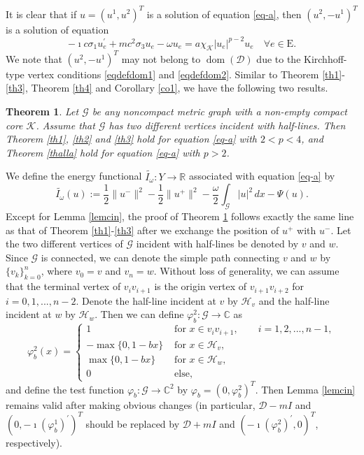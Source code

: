 \documentclass[11pt]{amsart}
\newtheorem{theorem}{Theorem}[section]
\newcommand{\abs}[1]{\lvert#1\rvert}
\newcommand{\norm}[1]{\lVert#1\rVert}
\newcommand{\D}{\mathcal{D}}
\newcommand{\G}{\mathcal{G}}
\newcommand{\K}{\mathcal{K}}
\newcommand{\h}{\mathcal{H}}
\numberwithin{equation}{section}
\begin{document}
It is clear that if  $u = (u^1, u^2)^T$ is a solution of equation \eqref{eq-a}, then $(u^2,-u^1)^T$ is a solution of equation
\begin{equation*}
    -\imath c \sigma_1 u_e^{\prime}+m c^2 \sigma_3 u_e - \omega u_e=a\chi_\K\abs{u_e}^{p-2}u_e \quad \forall e \in \mathrm{E}.
\end{equation*}
We note that $(u^2,-u^1)^T$ may not belong to $\operatorname{dom}(\D)$ due to the Kirchhoff-type vertex conditions \eqref{eqdefdom1} and \eqref{eqdefdom2}.
Similar to Theorem \ref{th1}-\ref{th3}, Theorem \ref{th4} and Corollary \ref{co1}, we have the following two results.
\begin{theorem}\label{th-a1}
      Let $\G$ be any noncompact metric graph with a non-empty compact core $\K$. Assume that $\G$ has two different vertices incident with half-lines. Then Theorem \ref{th1}, \ref{th2} and \ref{th3} hold for equation \eqref{eq-a} with $2<p<4$, and Theorem \ref{thalla} hold for equation \eqref{eq-a} with $p > 2$.
\end{theorem}
We define the energy functional $\tilde{I_{\omega}}: Y \to \mathbb{R}$ associated with equation \eqref{eq-a} by
$$
\widetilde{I_{\omega}}(u) := \frac{1}{2}\norm{u^{-}}^{2}-\frac{1}{2}\norm{u^{+}}^{2}-\frac{\omega}{2} \int_{\G}\abs{u}^{2} \,dx-\Psi(u).
$$
Except for Lemma \ref{lemcin}, the proof of Theorem \ref{th-a1} follows exactly the same line as that of Theorem \ref{th1}-\ref{th3} after we exchange the position of $u^+$ with $u^-$.
 Let the two different vertices of $\G$ incident with half-lines be denoted by $v$ and $w$. Since $\G$ is connected, we can denote the simple path connecting $v$ and $w$ by $\{v_k\}_{k=0}^n$, where $v_0=v$ and $v_n=w$. Without loss of generality, we can assume that the terminal vertex of $v_iv_{i+1}$ is the origin vertex of $v_{i+1}v_{i+2}$ for $i=0,1,...,n-2$. Denote the half-line incident at $v$ by $\mathcal{H}_v$ and the half-line incident at $w$ by $\mathcal{H}_w$. Then we can define $\varphi_{b}^2: \G \to \mathbb{C}$ as
$$
    \varphi_{b}^2(x)= \begin{cases}1 & \text { for } x \in v_iv_{i+1},\quad \quad i = 1,2,...,n-1,\\ -\max\{0,1-bx\} & \text { for } x \in \h_v,\\ \max\{0,1-bx\} & \text { for } x \in \h_w,\\0 &\text { else},  \end{cases}
$$
and define the test function $\varphi_{b}: \G \to \mathbb{C}^2$ by $\varphi_{b} = (0,\varphi_{b}^2)^T$.
Then Lemma \ref{lemcin} remains valid after making obvious changes (in particular, $\D-mI$ and $\left(0, -\imath \left(\varphi_{b}^1\right)^\prime\right)^T$ should be replaced by $\D + mI$ and $\left( -\imath \left(\varphi_{b}^2\right)^\prime,0\right)^T$, respectively).
\end{document}
